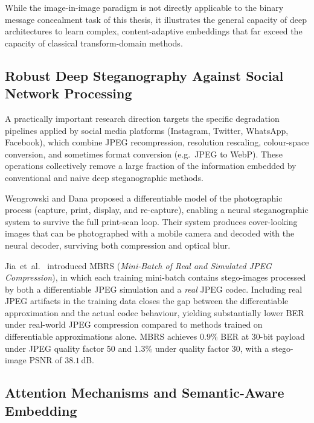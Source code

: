 \documentclass[12pt,a4paper,oneside]{report}
\begin{document}
	While the image-in-image paradigm is not directly applicable to the binary message concealment
	task of this thesis, it illustrates the general capacity of deep architectures to learn complex,
	content-adaptive embeddings that far exceed the capacity of classical transform-domain methods.
	
	\subsection{Robust Deep Steganography Against Social Network Processing}
	\label{subsec:social_network}
	
	A practically important research direction targets the specific degradation pipelines applied by
	social media platforms (Instagram, Twitter, WhatsApp, Facebook), which combine JPEG recompression,
	resolution rescaling, colour-space conversion, and sometimes format conversion (e.g.\ JPEG to
	WebP). These operations collectively remove a large fraction of the information embedded by
	conventional and naive deep steganographic methods.
	
	Wengrowski and Dana \cite{wengrowski2019light} proposed a differentiable model of the photographic
	process (capture, print, display, and re-capture), enabling a neural steganographic system to
	survive the full print-scan loop. Their system produces cover-looking images that can be
	photographed with a mobile camera and decoded with the neural decoder, surviving both compression
	and optical blur.
	
	Jia~et~al.\ \cite{jia2021mbrs} introduced MBRS (\textit{Mini-Batch of Real and Simulated JPEG
		Compression}), in which each training mini-batch contains stego-images processed by both a
	differentiable JPEG simulation and a \emph{real} JPEG codec. Including real JPEG artifacts in the
	training data closes the gap between the differentiable approximation and the actual codec behaviour,
	yielding substantially lower BER under real-world JPEG compression compared to methods trained on
	differentiable approximations alone. MBRS achieves $0.9\%$ BER at $30$-bit payload under JPEG
	quality factor 50 and $1.3\%$ under quality factor 30, with a stego-image PSNR of $38.1$\,dB.
	
	\subsection{Attention Mechanisms and Semantic-Aware Embedding}
	\label{subsec:attention}
	
\end{document}
